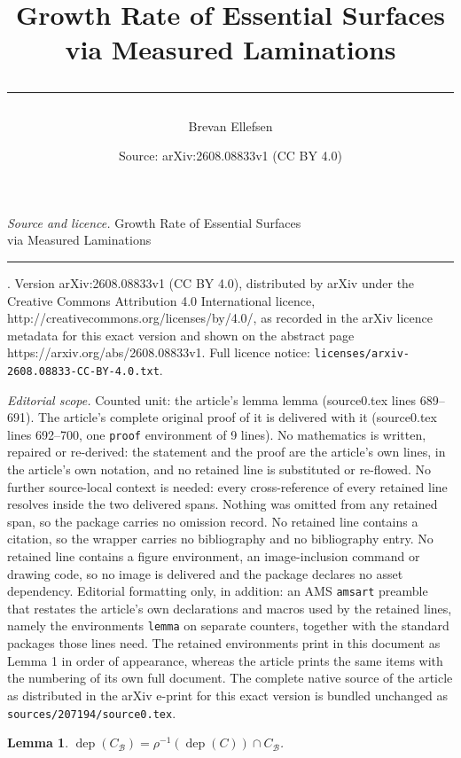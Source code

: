 \documentclass[10pt,a4paper]{amsart}
\title{\vspace{-3 cm}Growth Rate of Essential Surfaces\vspace{-0.2 cm}\\via Measured Laminations\vspace{-0.5 cm} \\\rule{0.3\textwidth}{.4pt} \vspace{-0.7 cm}}
\author{Brevan Ellefsen}
\date{Source: arXiv:2608.08833v1 (CC BY 4.0)}
\newtheorem{lemma}{Lemma}
\newcommand{\B}{\mathcal{B}}
\DeclareMathOperator{\dep}{dep}
\begin{document}
\maketitle

\noindent\emph{Source and licence.} \vspace{-3 cm}Growth Rate of Essential Surfaces\vspace{-0.2 cm}\\via Measured Laminations\vspace{-0.5 cm} \\\rule{0.3\textwidth}{.4pt} \vspace{-0.7 cm}. Version arXiv:2608.08833v1 (CC BY 4.0), distributed by arXiv under the Creative Commons Attribution 4.0 International licence, http://creativecommons.org/licenses/by/4.0/, as recorded in the arXiv licence metadata for this exact version and shown on the abstract page https://arxiv.org/abs/2608.08833v1. Full licence notice: \texttt{licenses/arxiv-2608.08833-CC-BY-4.0.txt}.\par\smallskip

\noindent\textit{Editorial scope.} Counted unit: the article's lemma lemma (source0.tex lines 689--691). The article's complete original proof of it is delivered with it (source0.tex lines 692--700, one \texttt{proof} environment of 9 lines). No mathematics is written, repaired or re-derived: the statement and the proof are the article's own lines, in the article's own notation, and no retained line is substituted or re-flowed.  No further source-local context is needed: every cross-reference of every retained line resolves inside the two delivered spans.  Nothing was omitted from any retained span, so the package carries no omission record.  No retained line contains a citation, so the wrapper carries no bibliography and no bibliography entry.  No retained line contains a figure environment, an image-inclusion command or drawing code, so no image is delivered and the package declares no asset dependency.  Editorial formatting only, in addition: an AMS \texttt{amsart} preamble that restates the article's own declarations and macros used by the retained lines, namely the environments \texttt{lemma} on separate counters, together with the standard packages those lines need.  The retained environments print in this document as Lemma 1 in order of appearance, whereas the article prints the same items with the numbering of its own full document.  The complete native source of the article as distributed in the arXiv e-print for this exact version is bundled unchanged as \texttt{sources/207194/source0.tex}.
\begin{lemma}
	$\dep(C_\B) = \rho^{-1}(\dep(C)) \cap C_\B$.
\end{lemma}
\end{document}
